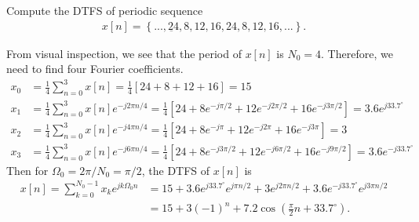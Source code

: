 \documentclass{report}
\begin{document}
\pagebreak
\begin{example}
    Compute the DTFS of periodic sequence 
    \begin{align*}
        x[n] = \left\{...,\underbar{24},8,12,16,24,8,12,16,...\right\}.
    \end{align*}
\end{example}
\begin{solution}
    From visual inspection, we see that the period of $x[n]$ is $N_0=4$. Therefore, we need to find four Fourier coefficients. 
    \begin{align*}
        x_0 &= \frac{1}{4} \sum_{n=0}^{3} x[n] = \frac{1}{4}[24+8+12+16] = 15 \\
        x_1 &= \frac{1}{4} \sum_{n=0}^{3} x[n]e^{-j2\pi n/4} = \frac{1}{4}[24+8e^{-j\pi/2}+12e^{-j2\pi/2}+16e^{-j3\pi/2}] = 3.6e^{j33.7^\circ} \\
        x_2 &= \frac{1}{4} \sum_{n=0}^{3} x[n]e^{-j4\pi n/4} = \frac{1}{4}[24+8e^{-j\pi}+12e^{-j2\pi}+16e^{-j3\pi}] = 3 \\
        x_3 &= \frac{1}{4} \sum_{n=0}^{3} x[n]e^{-j6\pi n/4} = \frac{1}{4}[24+8e^{-j3\pi/2}+12e^{-j6\pi/2}+16e^{-j9\pi/2}] = 3.6e^{-j33.7^\circ}
    \end{align*}
    Then for $\Omega_0=2\pi/N_0=\pi/2$, the DTFS of $x[n]$ is 
    \begin{align*}
        x[n] = \sum_{k=0}^{N_0-1} x_k e^{jk\Omega_0 n} &= 15 + 3.6e^{j33.7^\circ}e^{j\pi n/2} + 3e^{j2\pi n/2} + 3.6e^{-j33.7^\circ}e^{j3\pi n/2} \\
        &= 15 + 3(-1)^n + 7.2\cos\left(\frac{\pi}{2}n+33.7^\circ\right).
    \end{align*}
\end{solution}
\end{document}
